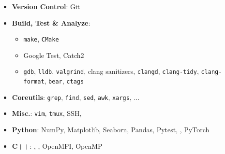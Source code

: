 \twocolumnsection
{
\begin{skills}
\end{skills}}
{
\vspace{1em}
\begin{itemize}
  \item \textbf{Version Control}: Git
  \item \textbf{Build, Test \& Analyze}:
    \begin{itemize}
      \item \texttt{make}, \texttt{CMake}
      \item Google Test, Catch2
      \item \texttt{gdb}, \texttt{lldb}, \texttt{valgrind}, clang sanitizers, \texttt{clangd}, \texttt{clang-tidy}, \texttt{clang-format}, \texttt{bear}, \texttt{ctags}
    \end{itemize}
  \item \textbf{Coreutils}: \texttt{grep}, \texttt{find}, \texttt{sed}, \texttt{awk}, \texttt{xargs}, ...
  \item \textbf{Misc.}: \texttt{vim}, \texttt{tmux}, SSH,
\end{itemize}}

\vspace{10pt}

{
  \vspace{1em}
  \begin{itemize}
    \item \textbf{Python}: NumPy, Matplotlib, Seaborn, Pandas, Pytest, , {\color{gray}PyTorch}
    \item \textbf{C++}: , , {\color{gray}OpenMPI}, {\color{gray}OpenMP}
  \end{itemize}
  }

